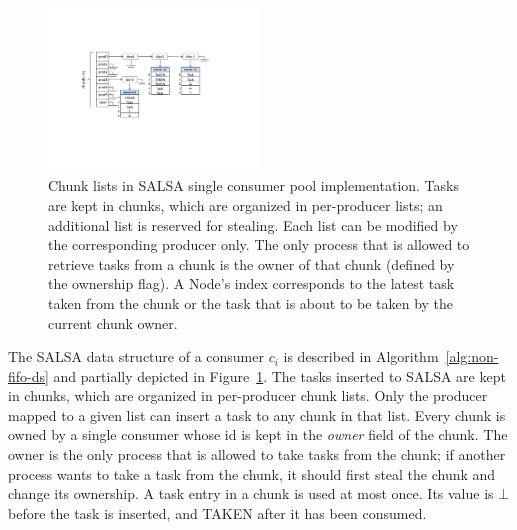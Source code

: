 \begin{figure}[htb]
	\centering
	\includegraphics[width=0.5\textwidth]{figures/salsa-struct}
	\vspace{-10pt}
	\caption{
	    \footnotesize{Chunk lists in SALSA single consumer pool implementation. Tasks are kept in chunks, which are 
	    organized in per-producer lists; an additional list is reserved for stealing. Each list can be modified 
	    by the corresponding producer only. The only process that is allowed to retrieve tasks from a chunk is 
	    the owner of that chunk (defined by the ownership flag). A Node's index corresponds to the latest task taken from the chunk
	    or the task that is about to be taken by the current chunk owner. 
	    }}
	\label{fig:salsa-struct}
	\vspace{-5pt}
\end{figure}

The SALSA data structure of a consumer $c_i$ is described in Algorithm~\ref{alg:non-fifo-ds} and partially depicted in Figure~\ref{fig:salsa-struct}. 
The tasks inserted to SALSA are kept in chunks, which are organized in per-producer chunk lists. Only the producer mapped to a given list can insert a task to any chunk in that list. Every chunk is owned by a single consumer whose id is kept in the \emph{owner} field of the chunk.
The owner is the only process that is allowed to take tasks from the chunk; if another process wants to take a task from the chunk, it should first steal the chunk and change its ownership. 
A task entry in a chunk is used at most once. Its value is $\bot$ before the task is inserted, and TAKEN after it has been consumed.

